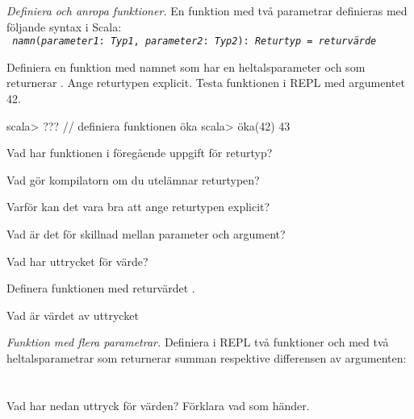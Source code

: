 
\Exercise{\ExeWeekTHREE}\label{exe:W03}
\begin{Goals}

\end{Goals}

\begin{Preparations}
\item {}
\end{Preparations}

\BasicTasks %

\Task \label{task:funcall}\emph{Definiera och anropa funktioner.} En funktion med två parametrar definieras med följande syntax i Scala: \vspace{0.5em} \\  \texttt{ \textit{namn}(\textit{parameter1}: \textit{Typ1}, \textit{parameter2}: \textit{Typ2}): \textit{Returtyp} = \textit{returvärde}}

\Subtask Definiera en funktion med namnet  som har en heltalsparameter  och som returnerar . Ange returtypen explicit. Testa funktionen i REPL med argumentet 42.

\begin{REPL}
scala> ???  // definiera funktionen öka
scala> öka(42)
43
\end{REPL}

\Subtask\Pen Vad har funktionen  i föregående uppgift för returtyp?

\Subtask\Pen Vad gör kompilatorn om du utelämnar returtypen?

\Subtask\Pen Varför kan det vara bra att ange returtypen explicit?

\Subtask\Pen Vad är det för skillnad mellan parameter och argument?

\Subtask Vad har uttrycket  för värde?

\Subtask Definera funktionen  med returvärdet .

\Subtask Vad är värdet av uttrycket 


\Task \emph{Funktion med flera parametrar.} Definiera i REPL två funktioner  och  med två heltalsparametrar som returnerar summan respektive differensen av argumenten: \\
 \\
 \\
Vad har nedan uttryck för värden? Förklara vad som händer.

